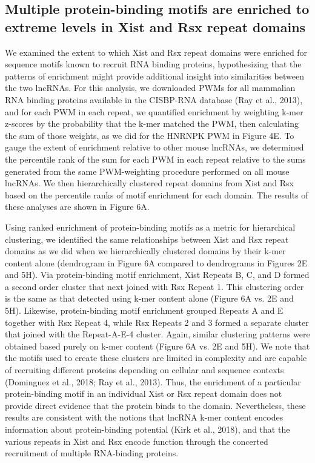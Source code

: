 \subsection{Multiple protein-binding motifs are enriched to extreme levels in Xist and Rsx repeat domains}
We examined the extent to which Xist and Rsx repeat domains were enriched for sequence motifs known to recruit RNA binding proteins, hypothesizing that the patterns of enrichment might provide additional insight into similarities between the two lncRNAs. For this analysis, we downloaded PWMs for all mammalian RNA binding proteins available in the CISBP-RNA database (Ray et al., 2013), and for each PWM in each repeat, we quantified enrichment by weighting k-mer z-scores by the probability that the k-mer matched the PWM, then calculating the sum of those weights, as we did for the HNRNPK PWM in Figure 4E. To gauge the extent of enrichment relative to other mouse lncRNAs, we determined the percentile rank of the sum for each PWM in each repeat relative to the sums generated from the same PWM-weighting procedure performed on all mouse lncRNAs. We then hierarchically clustered repeat domains from Xist and Rsx based on the percentile ranks of motif enrichment for each domain. The results of these analyses are shown in Figure 6A.

Using ranked enrichment of protein-binding motifs as a metric for hierarchical clustering, we  identified the same relationships between Xist and Rsx repeat domains as we did when we hierarchically clustered domains by their k-mer content alone (dendrogram in Figure 6A compared to dendrograms in Figures 2E and 5H). Via protein-binding motif enrichment, Xist Repeats B, C, and D formed a second order cluster that next joined with Rsx Repeat 1.  This clustering order is the same as that detected using k-mer content alone (Figure 6A vs. 2E and 5H). Likewise, protein-binding motif enrichment grouped Repeats A and E together with Rsx Repeat 4, while Rsx Repeats 2 and 3 formed a separate cluster that joined with the Repeat-A-E-4 cluster. Again, similar clustering patterns were obtained based purely on k-mer content (Figure 6A vs. 2E and 5H). We note that the motifs used to create these clusters are limited in complexity and are capable of recruiting different proteins depending on cellular and sequence contexts (Dominguez et al., 2018; Ray et al., 2013). Thus, the enrichment of a particular protein-binding motif in an individual Xist or Rsx repeat domain does not provide direct evidence that the protein binds to the domain. Nevertheless, these results are consistent with the notions that lncRNA k-mer content encodes information about protein-binding potential (Kirk et al., 2018), and that the various repeats in Xist and Rsx encode function through the concerted recruitment of multiple RNA-binding proteins.

